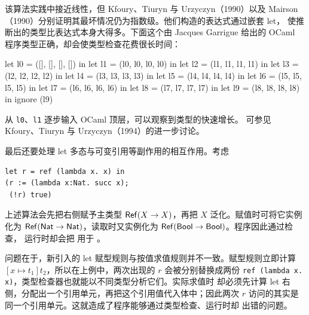 该算法实践中接近线性，但 Kfoury、Tiuryn 与 Urzyczyn（1990）以及 Mairson
（1990）分别证明其最坏情况仍为指数级。他们构造的表达式通过嵌套 let，
使推断出的类型比表达式本身大得多。下面这个由 Jacques Garrigue 给出的
OCaml 程序类型正确，却会使类型检查花费很长时间：
\begin{taplocamlcode}
let l0 = ([], [], [], []) in
let l1 = (l0, l0, l0, l0) in
let l2 = (l1, l1, l1, l1) in
let l3 = (l2, l2, l2, l2) in
let l4 = (l3, l3, l3, l3) in
let l5 = (l4, l4, l4, l4) in
let l6 = (l5, l5, l5, l5) in
let l7 = (l6, l6, l6, l6) in
let l8 = (l7, l7, l7, l7) in
let l9 = (l8, l8, l8, l8) in
ignore (l9)
\end{taplocamlcode}
\taplocamlsyntaxonly
从 \texttt{l0}、\texttt{l1} 逐步输入 OCaml 顶层，可以观察到类型的快速增长。
可参见 Kfoury、Tiuryn 与 Urzyczyn（1994）的进一步讨论。

最后还要处理 let 多态与可变引用等副作用的相互作用。考虑
\begin{lstlisting}
let r = ref (lambda x. x) in
(r := (lambda x:Nat. succ x);
 (!r) true)
\end{lstlisting}
上述算法会先把右侧赋予主类型
\(\mathsf{Ref}(X\to X)\)，再把 \(X\) 泛化。赋值时可将它实例化为
\(\mathsf{Ref}(\mathsf{Nat}\to\mathsf{Nat})\)，读取时又实例化为
\(\mathsf{Ref}(\mathsf{Bool}\to\mathsf{Bool})\)。程序因此通过检查，
运行时却会把  用于 。

问题在于，新引入的 let 赋型规则与按值求值规则并不一致。赋型规则立即计算
\([x\mapsto t_1]t_2\)，所以在上例中，两次出现的 \(r\) 会被分别替换成两份
\texttt{ref (lambda x. x)}，类型检查器也就能以不同类型分析它们。实际求值时
却必须先计算 let 右侧，分配出一个引用单元，再把这个引用值代入体中；因此两次
\(r\) 访问的其实是同一个引用单元。这就造成了程序能够通过类型检查、运行时却
出错的问题。

